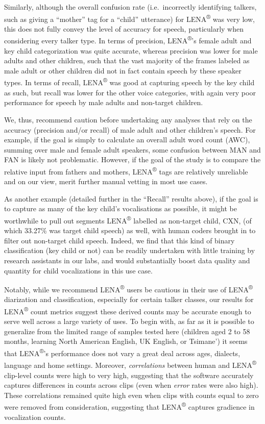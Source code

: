 \documentclass[english,floatsintext,man]{apa6}
\begin{document}
Similarly, although the overall confusion rate (i.e.~incorrectly
identifying talkers, such as giving a \enquote{mother} tag for a
\enquote{child} utterance) for LENA\textsuperscript{®} was very low,
this does not fully convey the level of accuracy for speech,
particularly when considering every talker type. In terms of precision,
LENA\textsuperscript{®}'s female adult and key child categorization was
quite accurate, whereas precision was lower for male adults and other
children, such that the vast majority of the frames labeled as male
adult or other children did not in fact contain speech by these speaker
types. In terms of recall, LENA\textsuperscript{®} was good at capturing
speech by the key child as such, but recall was lower for the other
voice categories, with again very poor performance for speech by male
adults and non-target children.

We, thus, recommend caution before undertaking any analyses that rely on
the accuracy (precision and/or recall) of male adult and other
children's speech. For example, if the goal is simply to calculate an
overall adult word count (AWC), summing over male and female adult
speakers, some confusion between MAN and FAN is likely not problematic.
However, if the goal of the study is to compare the relative input from
fathers and mothers, LENA\textsuperscript{®} tags are relatively
unreliable and on our view, merit further manual vetting in most use
cases.

As another example (detailed further in the \enquote{Recall} results
above), if the goal is to capture as many of the key child's
vocalisations as possible, it might be worthwhile to pull out segments
LENA\textsuperscript{®} labelled as non-target child, CXN, (of which
33.27\% was target child speech) as well, with human coders brought in
to filter out non-target child speech. Indeed, we find that this kind of
binary classification (key child or not) can be readily undertaken with
little training by research assistants in our labs, and would
substantially boost data quality and quantity for child vocalizations in
this use case.

Notably, while we recommend LENA\textsuperscript{®} users be cautious in
their use of LENA\textsuperscript{®} diarization and classification,
especially for certain talker classes, our results for
LENA\textsuperscript{®} count metrics suggest these derived counts may
be accurate enough to serve well across a large variety of uses. To
begin with, as far as it is possible to generalize from the limited
range of samples tested here (children aged 2 to 58 months, learning
North American English, UK English, or Tsimane') it seems that
LENA\textsuperscript{®}'s performance does not vary a great deal across
ages, dialects, language and home settings. Moreover,
\emph{correlations} between human and LENA\textsuperscript{®} clip-level
counts were high to very high, suggesting that the software accurately
captures differences in counts across clips (even when \emph{error}
rates were also high). These correlations remained quite high even when
clips with counts equal to zero were removed from consideration,
suggesting that LENA\textsuperscript{®} captures gradience in
vocalization counts.
\end{document}
